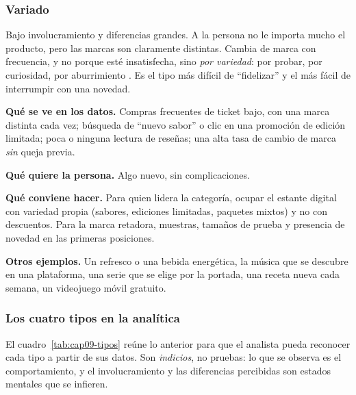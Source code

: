 \subsubsection{Variado}
\label{sec:cap09-variado}

Bajo involucramiento y diferencias grandes. A la persona no le importa mucho
el producto, pero las marcas son claramente distintas. Cambia de marca con
frecuencia, y no porque esté insatisfecha, sino \emph{por variedad}: por
probar, por curiosidad, por aburrimiento \parencite{assael1987}. Es el tipo
más difícil de \enquote{fidelizar} y el más fácil de interrumpir con una novedad.

\begin{cajaEjemplo}[title={Ejemplo digital: las papas de Camila}]
\textbf{Qué se ve en los datos.} Compras frecuentes de ticket bajo, con una marca
distinta cada vez; búsqueda de \enquote{nuevo sabor} o clic en una promoción de
edición limitada; poca o ninguna lectura de reseñas; una alta tasa de cambio
de marca \emph{sin} queja previa.

\textbf{Qué quiere la persona.} Algo nuevo, sin complicaciones.

\textbf{Qué conviene hacer.} Para quien lidera la categoría, ocupar el
estante digital con variedad propia (sabores, ediciones limitadas, paquetes
mixtos) y no con descuentos. Para la marca retadora, muestras, tamaños de
prueba y presencia de novedad en las primeras posiciones.
\end{cajaEjemplo}

\textbf{Otros ejemplos.} Un refresco o una bebida energética, la música que se
descubre en una plataforma, una serie que se elige por la portada, una receta
nueva cada semana, un videojuego móvil gratuito.

\subsubsection{Los cuatro tipos en la analítica}

El cuadro~\ref{tab:cap09-tipos} reúne lo anterior para que el analista pueda
reconocer cada tipo a partir de sus datos. Son \emph{indicios}, no pruebas: lo
que se observa es el comportamiento, y el involucramiento y las diferencias
percibidas son estados mentales que se infieren.

